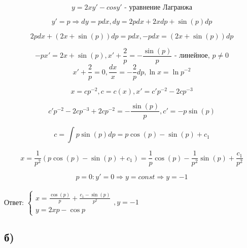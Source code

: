 \documentclass{article}
\begin{document}
\begin{equation*}
    y = 2xy' - cosy' \text{ - уравнение Лагранжа}
\end{equation*}

\begin{equation*}
    y' = p \Rightarrow dy = pdx, dy = 2pdx + 2xdp + \sin{(p)}dp
\end{equation*}

\begin{equation*}
    2pdx + (2x + \sin{(p)})dp = pdx, -pdx = (2x + \sin{(p)})dp
\end{equation*}

\begin{equation*}
    -px' = 2x + \sin{(p)} , x' + \frac{2}{p} = -\frac{\sin{(p)}}{p} \text{ - линейное, } p \ne 0
\end{equation*}
\begin{equation*}
    x' + \frac{2}{p} = 0, \frac{dx}{x} = -\frac{2}{p}dp, \ln{x} = \ln{p^{-2}}
\end{equation*}

\begin{equation*}
    x = cp^{-2}, c = c(x), x' = c'p^{-2} - 2cp^{-3}
\end{equation*}

\begin{equation*}
    c'p^{-2} - 2cp^{-3} + 2cp^{-2} = -\frac{\sin{(p)}}{p}, c' = -p\sin{(p)}
\end{equation*}

\begin{equation*}
    c = \int{p\sin{(p)}dp} = p\cos{(p)} - \sin{(p)} + c_1
\end{equation*}

\begin{equation*}
    x = \frac{1}{p^2}(p\cos{(p)} - \sin{(p)} + c_1) = \frac{1}{p}\cos{(p)} - \frac{1}{p^2}\sin{(p)} + \frac{c_1}{p^2}
\end{equation*}

\begin{equation*}
    p = 0: y' = 0 \Rightarrow y = const \Rightarrow y = -1
\end{equation*}
\\
Ответ:
$
    \begin{cases}
    x = \frac{\cos{(p)}}{p} + \frac{c_1 - \sin{(p)}}{p^2} \\
    y = 2xp - \cos{p}
    \end{cases} , y = -1
$
\subsection*{б)}
\end{document}
